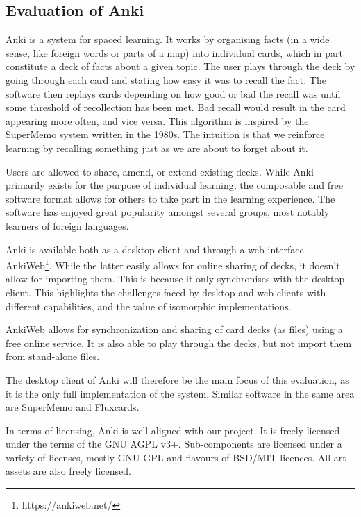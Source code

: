 \subsection{Evaluation of Anki}

Anki is a system for spaced learning. It works by organising facts (in a wide
sense, like foreign words or parts of a map) into individual cards, which in
part constitute a deck of facts about a given topic. The user plays through the
deck by going through each card and stating how easy it was to recall the fact.
The software then replays cards depending on how good or bad the recall was
until some threshold of recollection has been met. Bad recall would result in 
the card appearing more often, and vice versa. This algorithm is inspired by the
SuperMemo system written in the 1980s\cite{ankimanual}. The intuition is that 
we reinforce learning by recalling something just as we are about to forget 
about it.

Users are allowed to share, amend, or extend existing decks. While Anki
primarily exists for the purpose of individual learning, the composable and
free software format allows for others to take part in the learning 
experience. The software has enjoyed great popularity amongst several groups, 
most notably learners of foreign languages.

Anki is available both as a desktop client and through a web interface --- 
AnkiWeb\footnote{https://ankiweb.net/}. While the latter easily allows for 
online sharing of decks, it doesn't allow for importing them. This is because 
it only synchronises with the desktop client. This highlights the challenges 
faced by desktop and web clients with different capabilities, and the value of 
isomorphic implementations.

AnkiWeb allows for synchronization and sharing of card decks (as files) using 
a free online service. It is also able to play through the decks, but not 
import them from stand-alone files.

The desktop client of Anki will therefore be the main focus of this evaluation,
as it is the only full implementation of the system. Similar software in the
same area are SuperMemo and Fluxcards.

In terms of licensing, Anki is well-aligned with our project. It is freely 
licensed under the terms of the GNU AGPL v3+. Sub-components are licensed 
under a variety of licenses, mostly GNU GPL and flavours of BSD/MIT licences. 
All art assets are also freely licensed.


